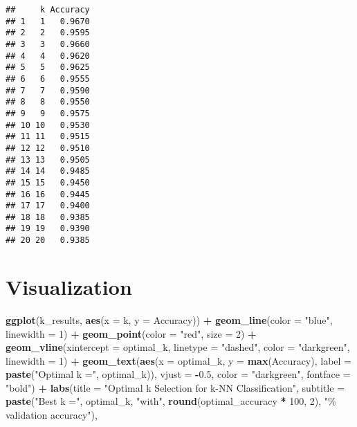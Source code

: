 \documentclass[
]{article}
\newenvironment{Shaded}{\begin{snugshade}}{\end{snugshade}}
\newcommand{\AttributeTok}[1]{\textcolor[rgb]{0.13,0.29,0.53}{#1}}
\newcommand{\DecValTok}[1]{\textcolor[rgb]{0.00,0.00,0.81}{#1}}
\newcommand{\FloatTok}[1]{\textcolor[rgb]{0.00,0.00,0.81}{#1}}
\newcommand{\FunctionTok}[1]{\textcolor[rgb]{0.13,0.29,0.53}{\textbf{#1}}}
\newcommand{\NormalTok}[1]{#1}
\newcommand{\SpecialCharTok}[1]{\textcolor[rgb]{0.81,0.36,0.00}{\textbf{#1}}}
\newcommand{\StringTok}[1]{\textcolor[rgb]{0.31,0.60,0.02}{#1}}
\begin{document}
\begin{verbatim}
##     k Accuracy
## 1   1   0.9670
## 2   2   0.9595
## 3   3   0.9660
## 4   4   0.9620
## 5   5   0.9625
## 6   6   0.9555
## 7   7   0.9590
## 8   8   0.9550
## 9   9   0.9575
## 10 10   0.9530
## 11 11   0.9515
## 12 12   0.9510
## 13 13   0.9505
## 14 14   0.9485
## 15 15   0.9450
## 16 16   0.9445
## 17 17   0.9400
## 18 18   0.9385
## 19 19   0.9390
## 20 20   0.9385
\end{verbatim}

\section{Visualization}\label{visualization}

\begin{Shaded}
\begin{Highlighting}[]
\FunctionTok{ggplot}\NormalTok{(k\_results, }\FunctionTok{aes}\NormalTok{(}\AttributeTok{x =}\NormalTok{ k, }\AttributeTok{y =}\NormalTok{ Accuracy)) }\SpecialCharTok{+}
  \FunctionTok{geom\_line}\NormalTok{(}\AttributeTok{color =} \StringTok{"blue"}\NormalTok{, }\AttributeTok{linewidth =} \DecValTok{1}\NormalTok{) }\SpecialCharTok{+} 
  \FunctionTok{geom\_point}\NormalTok{(}\AttributeTok{color =} \StringTok{"red"}\NormalTok{, }\AttributeTok{size =} \DecValTok{2}\NormalTok{) }\SpecialCharTok{+}
  \FunctionTok{geom\_vline}\NormalTok{(}\AttributeTok{xintercept =}\NormalTok{ optimal\_k, }\AttributeTok{linetype =} \StringTok{"dashed"}\NormalTok{, }\AttributeTok{color =} \StringTok{"darkgreen"}\NormalTok{, }\AttributeTok{linewidth =} \DecValTok{1}\NormalTok{) }\SpecialCharTok{+}
  \FunctionTok{geom\_text}\NormalTok{(}\FunctionTok{aes}\NormalTok{(}\AttributeTok{x =}\NormalTok{ optimal\_k, }\AttributeTok{y =} \FunctionTok{max}\NormalTok{(Accuracy), }
                \AttributeTok{label =} \FunctionTok{paste}\NormalTok{(}\StringTok{"Optimal k ="}\NormalTok{, optimal\_k)), }
            \AttributeTok{vjust =} \SpecialCharTok{{-}}\FloatTok{0.5}\NormalTok{, }\AttributeTok{color =} \StringTok{"darkgreen"}\NormalTok{, }\AttributeTok{fontface =} \StringTok{"bold"}\NormalTok{) }\SpecialCharTok{+}
  \FunctionTok{labs}\NormalTok{(}\AttributeTok{title =} \StringTok{"Optimal k Selection for k{-}NN Classification"}\NormalTok{,}
       \AttributeTok{subtitle =} \FunctionTok{paste}\NormalTok{(}\StringTok{"Best k ="}\NormalTok{, optimal\_k, }\StringTok{"with"}\NormalTok{, }\FunctionTok{round}\NormalTok{(optimal\_accuracy }\SpecialCharTok{*} \DecValTok{100}\NormalTok{, }\DecValTok{2}\NormalTok{), }\StringTok{"\% validation accuracy"}\NormalTok{),}

\end{Highlighting}
\end{Shaded}
\end{document}
